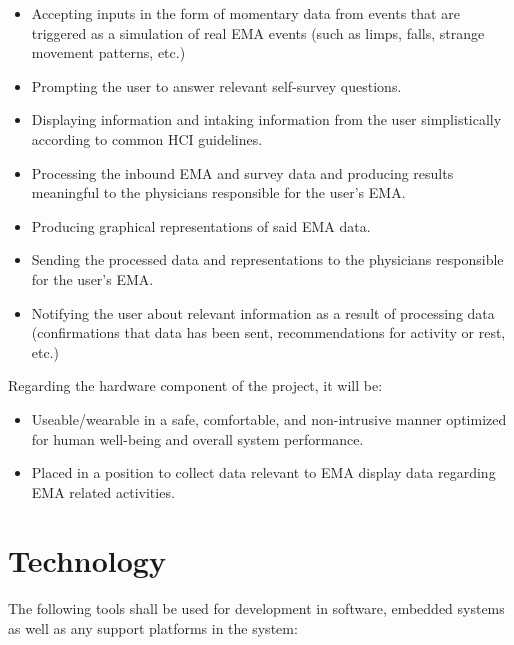 \documentclass{article}
\begin{document}
\begin{itemize}
\item Accepting inputs in the form of momentary data from events that are triggered as a simulation of real EMA events (such as limps, falls, strange movement patterns, etc.)
\item Prompting the user to answer relevant self-survey questions.
\item Displaying information and intaking information from the user simplistically according to common HCI guidelines.
\item Processing the inbound EMA and survey data and producing results meaningful to the physicians responsible for the user's EMA.
\item Producing graphical representations of said EMA data.
\item Sending the processed data and representations to the physicians responsible for the user's EMA.
\item Notifying the user about relevant information as a result of processing data (confirmations that data has been sent, recommendations for activity or rest, etc.)
\end{itemize}

Regarding the hardware component of the project, it will be:\\

\begin{itemize}
\item Useable/wearable in a safe, comfortable, and non-intrusive manner optimized for human well-being and overall system performance.
\item Placed in a position to collect data relevant to EMA display data regarding EMA related activities.
\end{itemize}

\section{Technology}
The following tools shall be used for development in software, embedded systems as well as any support platforms in the system:
\end{document}
